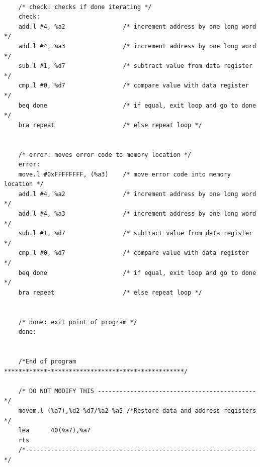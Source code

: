 \documentclass[10pt, letterpaper, titlepage]{article} %
\begin{document}
\begin{lstlisting}
	
	/* check: checks if done iterating */
	check:
	add.l #4, %a2                /* increment address by one long word */
	add.l #4, %a3                /* increment address by one long word */
	sub.l #1, %d7                /* subtract value from data register */
	cmp.l #0, %d7                /* compare value with data register */
	beq done                     /* if equal, exit loop and go to done */
	bra repeat                   /* else repeat loop */
	
	
	/* error: moves error code to memory location */
	error:
	move.l #0xFFFFFFFF, (%a3)    /* move error code into memory location */
	add.l #4, %a2                /* increment address by one long word */
	add.l #4, %a3                /* increment address by one long word */
	sub.l #1, %d7                /* subtract value from data register */
	cmp.l #0, %d7                /* compare value with data register */
	beq done                     /* if equal, exit loop and go to done */
	bra repeat                   /* else repeat loop */
	
	
	/* done: exit point of program */
	done:
	
	
	/*End of program **************************************************/
	
	/* DO NOT MODIFY THIS --------------------------------------------*/
	movem.l (%a7),%d2-%d7/%a2-%a5 /*Restore data and address registers */
	lea      40(%a7),%a7
	rts
	/*----------------------------------------------------------------*/
\end{lstlisting}
\end{document}

